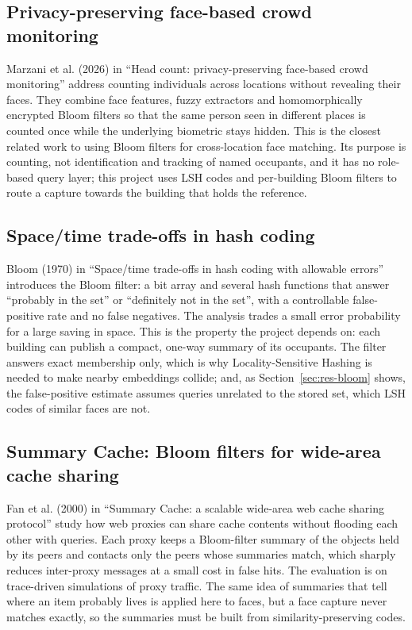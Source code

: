 \documentclass[12pt,a4paper,oneside]{report}
\begin{document}
\subsection{Privacy-preserving face-based crowd monitoring}
Marzani et al. (2026) in ``Head count: privacy-preserving face-based crowd monitoring'' \cite{ref11} address counting individuals across locations without revealing their faces. They combine face features, fuzzy extractors and homomorphically encrypted Bloom filters so that the same person seen in different places is counted once while the underlying biometric stays hidden. This is the closest related work to using Bloom filters for cross-location face matching. Its purpose is counting, not identification and tracking of named occupants, and it has no role-based query layer; this project uses LSH codes and per-building Bloom filters to route a capture towards the building that holds the reference.

\subsection{Space/time trade-offs in hash coding}
Bloom (1970) in ``Space/time trade-offs in hash coding with allowable errors'' \cite{ref12} introduces the Bloom filter: a bit array and several hash functions that answer ``probably in the set'' or ``definitely not in the set'', with a controllable false-positive rate and no false negatives. The analysis trades a small error probability for a large saving in space. This is the property the project depends on: each building can publish a compact, one-way summary of its occupants. The filter answers exact membership only, which is why Locality-Sensitive Hashing is needed to make nearby embeddings collide; and, as Section~\ref{sec:res-bloom} shows, the false-positive estimate assumes queries unrelated to the stored set, which LSH codes of similar faces are not.

\subsection{Summary Cache: Bloom filters for wide-area cache sharing}
Fan et al. (2000) in ``Summary Cache: a scalable wide-area web cache sharing protocol'' \cite{ref13} study how web proxies can share cache contents without flooding each other with queries. Each proxy keeps a Bloom-filter summary of the objects held by its peers and contacts only the peers whose summaries match, which sharply reduces inter-proxy messages at a small cost in false hits. The evaluation is on trace-driven simulations of proxy traffic. The same idea of summaries that tell where an item probably lives is applied here to faces, but a face capture never matches exactly, so the summaries must be built from similarity-preserving codes.
\end{document}
